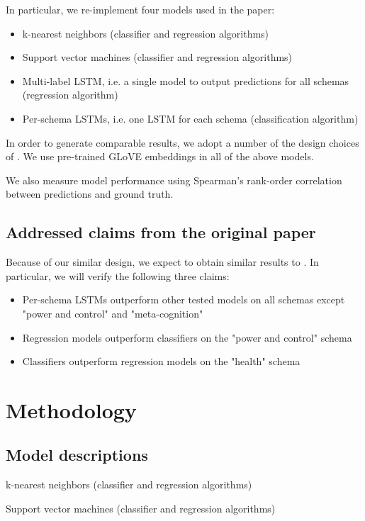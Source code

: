 \documentclass[11pt,a4paper]{article}
\begin{document}
In particular, we re-implement four models used in the paper:
\begin{itemize}
    \item k-nearest neighbors (classifier and regression algorithms)
    \item Support vector machines (classifier and regression algorithms)
    \item Multi-label LSTM, i.e. a single model to output predictions for all schemas (regression algorithm)
    \item Per-schema LSTMs, i.e. one LSTM for each schema (classification algorithm)
\end{itemize}

In order to generate comparable results, we adopt a number of the design choices of \citeauthor{burger_2021}. We use pre-trained GLoVE embeddings \citep{pennington_2014} in all of the above models. 

We also measure model performance using Spearman's rank-order correlation between predictions and ground truth. 

\subsection{Addressed claims from the original paper}
Because of our similar design, we expect to obtain similar results to \citeauthor{burger_2021}. In particular, we will verify the following three claims:
\begin{itemize}
    \item Per-schema LSTMs outperform other tested models on all schemas except "power and control" and "meta-cognition"
    \item Regression models outperform classifiers on the "power and control" schema
    \item Classifiers outperform regression models on the "health" schema
\end{itemize}

\section{Methodology}
\subsection{Model descriptions}
k-nearest neighbors (classifier and regression algorithms)


Support vector machines (classifier and regression algorithms)
\end{document}
